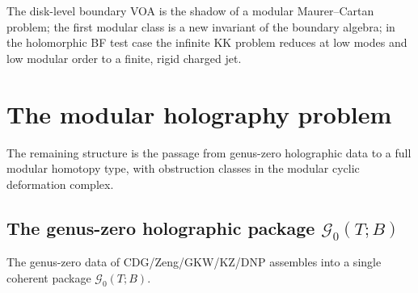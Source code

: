 The disk-level boundary VOA is the shadow of a modular Maurer--Cartan
problem; the first modular class is a new invariant of the boundary
algebra; in the holomorphic BF test case the infinite KK problem
reduces at low modes and low modular order to a finite, rigid
charged jet.


\providecommand{\ModEnv}{\operatorname{ModEnv}}
\providecommand{\Fact}{\operatorname{Fact}}
\providecommand{\ot}{\widehat\otimes}

\section{The modular holography problem}
\label{sec:modular-holography-problem}

The remaining structure is the passage from genus-zero holographic
data to a full modular homotopy type, with obstruction classes in the
modular cyclic deformation complex.

\subsection{The genus-zero holographic package $\mathcal G_0(T;B)$}
\label{subsec:genus-zero-holographic-package}

The genus-zero data of CDG/Zeng/GKW/KZ/DNP assembles into a single
coherent package $\mathcal G_0(T;B)$.


